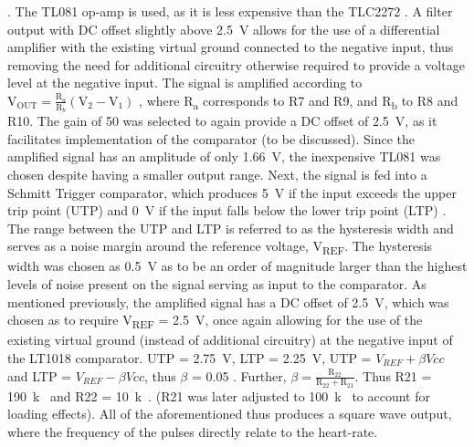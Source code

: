 \cite{filter}. The TL081 op-amp is used, as it is less expensive than the TLC2272 \cite{octo}. A filter output with DC offset slightly above \SI{2.5}{V} allows for the use of a differential amplifier with the existing virtual ground connected to the negative input, thus removing the need for additional circuitry otherwise required to provide a voltage level at the negative input. The signal is amplified according to $\mathrm{V}_{\mathrm{OUT}}=\frac{\mathrm{R}_{a}}{\mathrm{R}_{b}}\left(\mathrm{V}_{2}-\mathrm{V}_{1}\right)$ \cite{opamp}, where R\textsubscript{a} corresponds to R7 and R9, and R\textsubscript{b} to R8 and R10. The gain of 50 was selected to again provide a DC offset of \SI{2.5}{V}, as it facilitates implementation of the comparator (to be discussed). Since the amplified signal has an amplitude of only \SI{1.66}{V}, the inexpensive TL081 was chosen despite having a smaller output range. Next, the signal is fed into a Schmitt Trigger comparator, which produces \SI{5}{V} if the input exceeds the upper trip point (UTP) and \SI{0}{V} if the input falls below the lower trip point (LTP) \cite{schmitt}. The range between the UTP and LTP is referred to as the hysteresis width and serves as a noise margin \cite{schmitt} around the reference voltage, V\textsubscript{REF}. The hysteresis width was chosen as \SI{0.5}{V} as to be an order of magnitude larger than the highest levels of noise present on the signal serving as input to the comparator. As mentioned previously, the amplified signal has a DC offset of \SI{2.5}{V}, which was chosen as to require V\textsubscript{REF} = \SI{2.5}{V}, once again allowing for the use of the existing virtual ground (instead of additional circuitry) at the negative input of the LT1018 comparator. UTP = \SI{2.75}{V}, LTP = \SI{2.25}{V}, UTP = $V_{REF} + \beta Vcc$ and LTP = $V_{REF} - \beta Vcc$, thus $\beta$ = 0.05 \cite{schmitt}. Further, $\beta=\frac{\mathrm{R}_{22}}{\mathrm{R}_{22}+\mathrm{R}_{21}}$. Thus R21 = \SI{190}{k\Omega} and R22 = \SI{10}{k\Omega}. (R21 was later adjusted to \SI{100}{k\Omega} to account for loading effects). All of the aforementioned thus produces a square wave output, where the frequency of the pulses directly relate to the heart-rate.

























